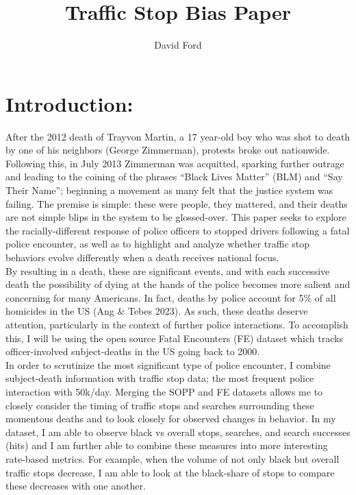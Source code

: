 \documentclass[12pt,a4paper]{article}
\begin{document}

\title{Traffic Stop Bias Paper}
\author{David Ford}
\maketitle



\section{Introduction:} 

After the 2012 death of Trayvon Martin, a 17 year-old boy who was shot to death by one of his neighbors (George Zimmerman), protests broke out nationwide. Following this, in July 2013 Zimmerman was acquitted, sparking further outrage and leading to the coining of the phrases ``Black Lives Matter'' (BLM) and ``Say Their Name''; beginning a movement as many felt that the justice system was failing. The premise is simple: these were people, they mattered, and their deaths are not simple blips in the system to be glossed-over. This paper seeks to explore the racially-different response of police officers to stopped drivers following a fatal police encounter, as well as to highlight and analyze whether traffic stop behaviors evolve differently when a death receives national focus. \\ 

By resulting in a death, these are significant events, and with each successive death the possibility of dying at the hands of the police becomes more salient and concerning for many Americans. In fact, deaths by police account for 5\% of all homicides in the US (Ang \& Tebes 2023). As such, these deaths deserve attention, particularly in the context of further police interactions. To accomplish this, I will be using the open source Fatal Encounters (FE) dataset which tracks officer-involved subject-deaths in the US going back to 2000. \\

In order to scrutinize the most significant type of police encounter, I combine subject-death information with traffic stop data; the most frequent police interaction with 50k/day. Merging the SOPP and FE datasets allows me to closely consider the timing of traffic stops and searches surrounding these momentous deaths and to look closely for observed changes in behavior. In my dataset, I am able to observe black vs overall stops, searches, and search successes (hits) and I am further able to combine these measures into more interesting rate-based metrics. For example, when the volume of not only black but overall traffic stops decrease, I am able to look at the black-share of stops to compare these decreases with one another. 
\end{document}
